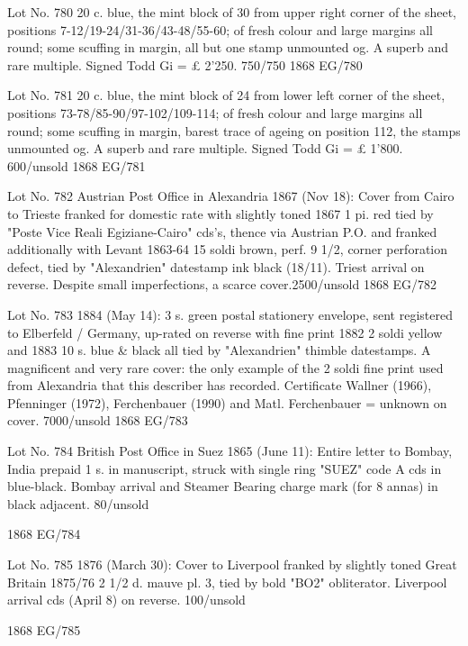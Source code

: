 \documentclass[justified]{tufte-book}
\begin{document}
%
{Lot No. 780
20 c. blue, the mint block of 30 from upper right corner of the sheet, positions 7-12/19-24/31-36/43-48/55-60; of fresh colour and large margins all round; some scuffing in margin, all but one stamp unmounted og. A superb and rare multiple. Signed Todd Gi = £ 2'250. 750/750
}%
{1868}%
{EG/780}%
{}%
{}
{}%
{}

%
{Lot No. 781
20 c. blue, the mint block of 24 from lower left corner of the sheet, positions 73-78/85-90/97-102/109-114; of fresh colour and large margins all round; some scuffing in margin, barest trace of ageing on position 112, the stamps unmounted og. A superb and rare multiple. Signed Todd Gi = £ 1'800. 600/unsold
}%
{1868}%
{EG/781}%
{}%
{}
{}%
{}

%
{Lot No. 782
Austrian Post Office in Alexandria 1867 (Nov 18): Cover from Cairo to Trieste franked for domestic rate with slightly toned 1867 1 pi. red tied by "Poste Vice Reali Egiziane-Cairo" cds's, thence via Austrian P.O. and franked additionally with Levant 1863-64 15 soldi brown, perf. 9 1/2, corner perforation defect, tied by "Alexandrien" datestamp ink black (18/11). Triest arrival on reverse. Despite small imperfections, a scarce cover.2500/unsold
}%
{1868}%
{EG/782}%
{}%
{}
{}%
{}

%
{Lot No. 783
1884 (May 14): 3 s. green postal stationery envelope, sent registered to Elberfeld / Germany, up-rated on reverse with fine print 1882 2 soldi yellow and 1883 10 s. blue \& black all tied by "Alexandrien" thimble datestamps. A magnificent and very rare cover: the only example of the 2 soldi fine print used from Alexandria that this describer has recorded. Certificate Wallner (1966), Pfenninger (1972), Ferchenbauer (1990) and Matl. Ferchenbauer = unknown on cover. 7000/unsold
}%
{1868}%
{EG/783}%
{}%
{}
{}%
{}

%
{
Lot No. 784
British Post Office in Suez 1865 (June 11): Entire letter to Bombay, India prepaid 1 s. in manuscript, struck with single ring "SUEZ" code A cds in blue-black. Bombay arrival and Steamer Bearing charge mark (for 8 annas) in black adjacent. 80/unsold

}%
{1868}%
{EG/784}%
{}%
{}
{}%
{}

%
{
Lot No. 785
1876 (March 30): Cover to Liverpool franked by slightly toned Great Britain 1875/76 2 1/2 d. mauve pl. 3, tied by bold "BO2" obliterator. Liverpool arrival cds (April 8) on reverse. 100/unsold

}%
{1868}%
{EG/785}%
{}%
{}
{}%
{}
\end{document}
